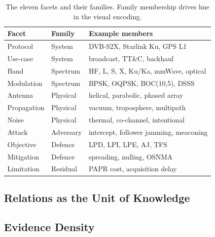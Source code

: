 \documentclass[10pt,a4paper]{article}
\newif\ifshowguides
\newcommand{\guide}[1]{%
  \ifshowguides
    {\par\smallskip\footnotesize\color{guidecol}%
     \textbf{[guide]}~#1\par\smallskip}%
  \fi}
\begin{document}
\begin{table}[t]
\caption{The eleven facets and their families. Family membership drives
hue in the visual encoding.}
\label{tab:facets}
\centering
\footnotesize
\begin{tabular}{@{}lll@{}}
\toprule
\textbf{Facet} & \textbf{Family} & \textbf{Example members} \\
\midrule
Protocol     & System     & DVB-S2X, Starlink Ku, GPS L1 \\
Use-case     & System     & broadcast, TT\&C, backhaul \\
Band         & Spectrum   & HF, L, S, X, Ku/Ka, mmWave, optical \\
Modulation   & Spectrum   & BPSK, OQPSK, BOC(10,5), DSSS \\
Antenna      & Physical   & helical, parabolic, phased array \\
Propagation  & Physical   & vacuum, troposphere, multipath \\
Noise        & Physical   & thermal, co-channel, intentional \\
Attack       & Adversary  & intercept, follower jamming, meaconing \\
Objective    & Defence    & LPD, LPI, LPE, AJ, TFS \\
Mitigation   & Defence    & spreading, nulling, OSNMA \\
Limitation   & Residual   & PAPR cost, acquisition delay \\
\bottomrule
\end{tabular}
\end{table}

\subsection{Relations as the Unit of Knowledge}

\subsection{Evidence Density}

\guide{\textbf{Load-bearing, and currently unanswered.} Evidence density
is the quantity the entire visual encoding maps to luminance, so ``how
did you count?'' is the first question a reviewer asks. Three
operationalisations are available: raw citation count per cell;
normalised count against facet-pair prior; or an ordinal rubric
(none~/~anecdotal~/~empirical~/~replicated). Recommend the ordinal
rubric with two independent raters and a reported Cohen's~$\kappa$ ---
it is the only option that survives the question ``why is this cell
darker than that one?''}
\end{document}
